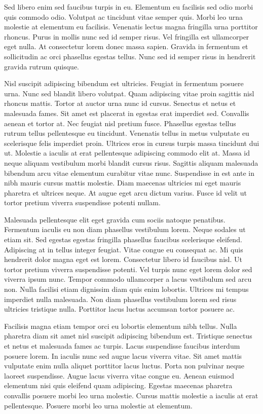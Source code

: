 \documentclass[11pt,a4paper]{article}
\begin{document}
Sed libero enim sed faucibus turpis in eu. Elementum eu facilisis sed odio morbi quis commodo odio. Volutpat ac tincidunt vitae semper quis. Morbi leo urna molestie at elementum eu facilisis. Venenatis lectus magna fringilla urna porttitor rhoncus. Purus in mollis nunc sed id semper risus. Vel fringilla est ullamcorper eget nulla. At consectetur lorem donec massa sapien. Gravida in fermentum et sollicitudin ac orci phasellus egestas tellus. Nunc sed id semper risus in hendrerit gravida rutrum quisque.

Nisl suscipit adipiscing bibendum est ultricies. Feugiat in fermentum posuere urna. Nunc sed blandit libero volutpat. Quam adipiscing vitae proin sagittis nisl rhoncus mattis. Tortor at auctor urna nunc id cursus. Senectus et netus et malesuada fames. Sit amet est placerat in egestas erat imperdiet sed. Convallis aenean et tortor at. Nec feugiat nisl pretium fusce. Phasellus egestas tellus rutrum tellus pellentesque eu tincidunt. Venenatis tellus in metus vulputate eu scelerisque felis imperdiet proin. Ultrices eros in cursus turpis massa tincidunt dui ut. Molestie a iaculis at erat pellentesque adipiscing commodo elit at. Massa id neque aliquam vestibulum morbi blandit cursus risus. Sagittis aliquam malesuada bibendum arcu vitae elementum curabitur vitae nunc. Suspendisse in est ante in nibh mauris cursus mattis molestie. Diam maecenas ultricies mi eget mauris pharetra et ultrices neque. At augue eget arcu dictum varius. Fusce id velit ut tortor pretium viverra suspendisse potenti nullam.

Malesuada pellentesque elit eget gravida cum sociis natoque penatibus. Fermentum iaculis eu non diam phasellus vestibulum lorem. Neque sodales ut etiam sit. Sed egestas egestas fringilla phasellus faucibus scelerisque eleifend. Adipiscing at in tellus integer feugiat. Vitae congue eu consequat ac. Mi quis hendrerit dolor magna eget est lorem. Consectetur libero id faucibus nisl. Ut tortor pretium viverra suspendisse potenti. Vel turpis nunc eget lorem dolor sed viverra ipsum nunc. Tempor commodo ullamcorper a lacus vestibulum sed arcu non. Nulla facilisi etiam dignissim diam quis enim lobortis. Ultrices mi tempus imperdiet nulla malesuada. Non diam phasellus vestibulum lorem sed risus ultricies tristique nulla. Porttitor lacus luctus accumsan tortor posuere ac.

Facilisis magna etiam tempor orci eu lobortis elementum nibh tellus. Nulla pharetra diam sit amet nisl suscipit adipiscing bibendum est. Tristique senectus et netus et malesuada fames ac turpis. Lacus suspendisse faucibus interdum posuere lorem. In iaculis nunc sed augue lacus viverra vitae. Sit amet mattis vulputate enim nulla aliquet porttitor lacus luctus. Porta non pulvinar neque laoreet suspendisse. Augue lacus viverra vitae congue eu. Aenean euismod elementum nisi quis eleifend quam adipiscing. Egestas maecenas pharetra convallis posuere morbi leo urna molestie. Cursus mattis molestie a iaculis at erat pellentesque. Posuere morbi leo urna molestie at elementum.
\end{document}
